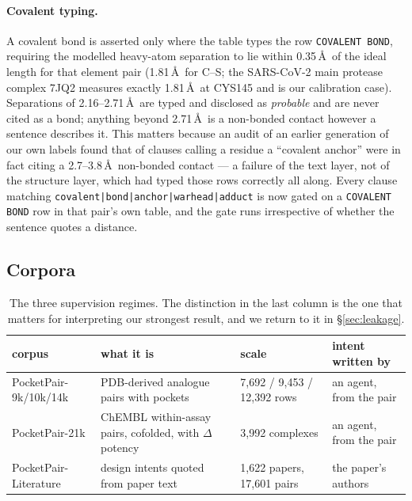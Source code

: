 \paragraph{Covalent typing.} A covalent bond is asserted only where the table types the row
\texttt{COVALENT BOND}, requiring the modelled heavy-atom separation to lie within 0.35\,\AA\ of the
ideal length for that element pair (1.81\,\AA\ for C--S; the SARS-CoV-2 main protease complex
7JQ2 measures exactly 1.81\,\AA\ at CYS145 and is our calibration case). Separations of
2.16--2.71\,\AA\ are typed and disclosed as \emph{probable} and are never cited as a bond; anything
beyond 2.71\,\AA\ is a non-bonded contact however a sentence describes it. This matters because an
audit of an earlier generation of our own labels found that  of clauses calling
a residue a ``covalent anchor'' were in fact citing a 2.7--3.8\,\AA\ non-bonded contact --- a
failure of the text layer, not of the structure layer, which had typed those rows correctly all
along. Every clause matching \texttt{covalent|bond|anchor|warhead|adduct} is now gated on a
\texttt{COVALENT BOND} row in that pair's own table, and the gate runs irrespective of whether the
sentence quotes a distance.

\subsection{Corpora}

\begin{table}[H]\centering\small
\begin{tabular}{llll}
\toprule
corpus & what it is & scale & intent written by \\
\midrule
PocketPair-9k/10k/14k & PDB-derived analogue pairs with pockets & 7{,}692 / 9{,}453 / 12{,}392 rows & an agent, from the pair \\
PocketPair-21k & ChEMBL within-assay pairs, cofolded, with $\Delta$potency & 3{,}992 complexes & an agent, from the pair \\
PocketPair-Literature & design intents quoted from paper text & 1{,}622 papers, 17{,}601 pairs & the paper's authors \\
\bottomrule
\end{tabular}
\caption{The three supervision regimes. The distinction in the last column is the one that matters
for interpreting our strongest result, and we return to it in \S\ref{sec:leakage}.}
\end{table}


